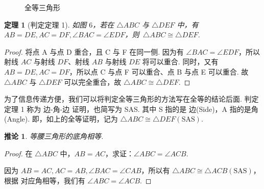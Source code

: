 \documentclass[a4paper]{article}
\newtheorem{theorem}{定理}[section]
\newtheorem{corollary}{推论}[section]
\begin{document}
\begin{figure}[htbp]
    \centering
    \begin{minipage}{0.4\textwidth}
        \centering
    \end{minipage}
    \begin{minipage}{0.4\textwidth}
        \centering
    \end{minipage}
    \centering
    \caption{全等三角形}
\end{figure}

\begin{theorem}[判定定理 1]
    如图 $6$，若在 $\triangle ABC$ 与 $\triangle DEF$ 中，有 $AB=DE,AC=DF,\angle BAC=\angle EDF$，则\
    $\triangle ABC\cong \triangle DEF$.
\end{theorem}

\begin{proof}
    将点 A 与点 D 重合，且 C 与 F 在同一侧. 因为有 $\angle BAC=\angle EDF$，所以射线 $AC$ 与射线 $DF$、射线
    $AB$ 与射线 $DE$ 将可以重合. 同时，又有 $AB=DE,AC=DF$，所以点 C 与点 F 可以重合、点 B 与点 E 可以重合. 故
    $\triangle ABC$ 与 $\triangle DEF$ 可以完全重合，故 $\triangle ABC\cong \triangle DEF$.
\end{proof}

为了信息传递方便，我们可以将判定全等三角形的方法写在全等的结论后面. 判定定理 1 称为 边-角-边 证明，也简写为 SAS. 其中
S 指的是 边(Side)，A 指的是角(Angle). 即，如上的全等证明，记为 $\triangle ABC\cong \triangle DEF (\text{SAS})$.

\begin{corollary}
    等腰三角形的底角相等.
\end{corollary}

\begin{proof}
    在 $\triangle ABC$ 中，$AB=AC$，求证：$\angle ABC=\angle ACB$.

    因为 $AB=AC,AC=AB,\angle BAC=\angle CAB$，所以有 $\triangle ABC \cong \triangle ACB (\text{SAS})$，根据
    对应角相等，我们有 $\angle ABC=\angle ACB$.
\end{proof}
\end{document}
